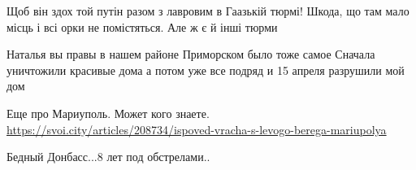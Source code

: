 
Щоб він здох той путін разом з лавровим в Гаазькій тюрмі! Шкода, що там мало
місць і всі орки не помістяться. Але ж є й інші тюрми


Наталья вы правы в нашем районе Приморском было тоже самое Сначала уничтожили
красивые дома а потом уже все подряд и 15 апреля разрушили мой дом


Еще про Мариуполь. Может кого знаете.
\url{https://svoi.city/articles/208734/ispoved-vracha-s-levogo-berega-mariupolya}


Бедный Донбасс...8 лет под обстрелами..
